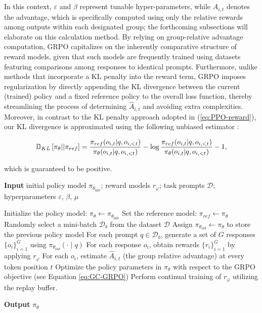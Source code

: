 \begin{itemize}[topsep=0pt]
\begin{itemize}[topsep=0pt]
In this context, $\varepsilon$ and $\beta$ represent tunable hyper-parameters, while $\hat{A}_{i,t}$ denotes the advantage, which is specifically computed using only the relative rewards among outputs within each designated group; the forthcoming subsections will elaborate on this calculation method. By relying on group-relative advantage computation, GRPO capitalizes on the inherently comparative structure of reward models, given that such models are frequently trained using datasets featuring comparisons among responses to identical prompts. Furthermore, unlike methods that incorporate a KL penalty into the reward term, GRPO imposes regularization by directly appending the KL divergence between the current (trained) policy and a fixed reference policy to the overall loss function, thereby streamlining the process of determining $\hat{A}_{i,t}$ and avoiding extra complexities. Moreover, in contrast to the KL penalty approach adopted in (\ref{eq:PPO-reward}), our KL divergence is approximated using the following unbiased estimator \citep{kl_approx}:

\begin{equation}
\small
    \mathbb{D}_{KL}\left[\pi_{\theta} || \pi_{ref}\right] = \frac{\pi_{ref}(o_{i,t}|q,o_{i,<t})}{\pi_{\theta}(o_{i,t}|q,o_{i,<t})}- \log\frac{\pi_{ref}(o_{i,t}|q,o_{i,<t})}{\pi_{\theta}(o_{i,t}|q,o_{i,<t})} - 1,
\end{equation}

which is guaranteed to be positive.

\begin{algorithm}[t]
  \small
  \caption{Iterative Group Relative Policy Optimization}
  \textbf{Input} initial policy model $\pi_{\theta_{\text{init}}}$; reward models $r_\varphi$; task prompts $\mathcal{D}$; 
  hyperparameters $\varepsilon$, $\beta$, $\mu$
  \begin{algorithmic}[1]
    \State Initialize the policy model: $\pi_\theta \leftarrow \pi_{\theta_{\text{init}}}$
       \State Set the reference model: $\pi_{ref} \leftarrow \pi_{\theta}$
      \State Randomly select a mini-batch $\mathcal{D}_b$ from the dataset $\mathcal{D}$
      \State Assign $\pi_{\theta_{old}} \leftarrow \pi_{\theta}$ to store the previous policy model
      \State For each prompt $q \in \mathcal{D}_b$, generate a set of $G$ responses $\{o_i\}_{i=1}^G$ using $\pi_{\theta_{old}} (\cdot \mid q)$
      \State For each response $o_i$, obtain rewards $\{r_i\}_{i=1}^{G}$ by applying $r_{\varphi}$
      \State For each $o_i$, estimate $\hat{A}_{i,t}$ (the group relative advantage) at every token position $t$
        \State Optimize the policy parameters in $\pi_{\theta}$ with respect to the GRPO objective (see Equation \ref{eq:GC-GRPO})
      \EndFor
    \EndFor
    \State Perform continual training of $r_\varphi$ utilizing the replay buffer.
    \EndFor 
  \end{algorithmic}
  \textbf{Output} $\pi_\theta$
  \label{alg:iter-grpo}
\end{algorithm}


\end{itemize}
\end{itemize}
